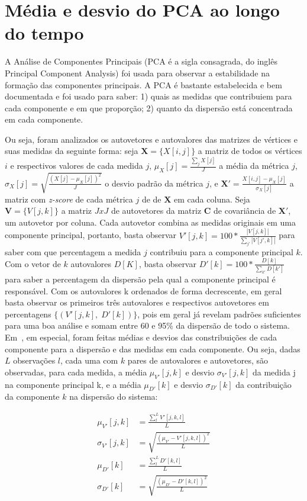\documentclass[a4paper,openright,12pt]{report} %
\begin{document}
\section{Média e desvio do PCA ao longo do tempo}
A Análise de Componentes Principais (PCA é a sigla consagrada, do inglês Principal Component Analysis) foi usada para observar a estabilidade
na formação das componentes principais.
A PCA é bastante estabelecida e bem documentada
e foi usado para saber: 
1) quais as medidas que contribuiem para cada componente e em que proporção;
2) quanto da dispersão está concentrada em cada componente.

Ou seja, foram analizados os autovetores e autovalores das matrizes
de vértices e suas medidas da seguinte forma: seja $\mathbf{X}=\{X[i,j]\}$
a matriz de todos os vértices $i$ e respectivos valores de cada medida $j$, 
$\mu_X [j]=\frac{\sum_j X[j]}{J}$ a média da métrica $j$, 
$\sigma_X [j]=\sqrt{\frac{(X[j]-\mu_X [j])^2}{J}}$ o desvio padrão da métrica $j$,
e $\mathbf{X'}={\frac{X[i,j]-\mu_X[j]}{\sigma_X[j]}}$ a matriz com \emph{z-score} de cada métrica $j$ de de $\mathbf{X}$ em cada coluna. Seja $\mathbf{V}=\{V[j,k]\}$ a matriz $JxJ$ de autovetores da matriz $\mathbf{C}$ de covariância
de $\mathbf{X'}$, um autovetor por coluna.
Cada autovetor combina as medidas originais em uma componente principal, portanto, basta observar 
$V'[j,k]=100*\frac{|V[j,k]|}{\sum_{j'} |V[j',k]|}$
para saber com que percentagem a medida $j$ contribuiu
para a componente principal $k$.
Com o vetor de $k$ autovalores $D[K]$,
basta observar $D'[k]=100*\frac{D[k]}{\sum_{k'}D[k']}$ para saber
a percentagem da dispersão pela qual a componente principal é responsável.
Com os autovalores k ordenados de forma decrescente, 
em geral basta observar os primeiros três autovalores e respectivos
autovetores em percentagens $\{(V'[j,k],\;D'[k])\}$, pois em geral
já revelam padrões suficientes para uma boa análise e somam entre 60 e 95\% da dispersão de todo o sistema.
Em~\cite{timeS}, em especial, foram feitas médias e desvios das constribuições de cada componente para a dispersão e das medidas em cada componente. Ou seja, dadas $L$ observações $l$, cada uma com $k$ pares de autovalores e autovetores, são observadas, para cada medida,
a média $\mu_{V'}[j,k]$ e desvio $\sigma_{V'}[j,k]$ 
da medida j na componente principal k,
e a média $\mu_{D'}[k]$ e desvio $\sigma_{D'}[k]$ da 
contribuição da componente $k$ na dispersão do sistema:

\begin{align}\label{eq:pca}
\mu_{V'}[j,k]   &=\frac{\sum_l^L V'[j,k,l]}{L}\nonumber\\
\sigma_{V'}[j,k]&=\sqrt{\frac{(\mu_{V'}-V'[j,k,l])^2}{L}}\\\nonumber
\mu_{D'}[k]&=\frac{\sum_l^L D'[k,l]}{L}\\\nonumber
\sigma_{D'}[k]&=\sqrt{\frac{(\mu_{D'}-D'[k,l])^2}{L}}
\end{align}
\end{document}
